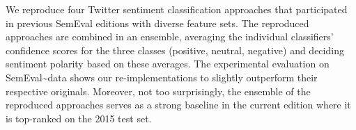 We reproduce four Twitter sentiment classification approaches that participated in previous SemEval editions with diverse feature sets. The reproduced approaches are combined in an ensemble, averaging the individual classifiers' confidence scores for the three classes (positive, neutral, negative) and deciding sentiment polarity based on these averages. The experimental evaluation on SemEval{\textasciitilde}data shows our re-implementations to slightly outperform their respective originals. Moreover, not too surprisingly, the ensemble of the reproduced approaches serves as a strong baseline in the current edition where it is top-ranked on the 2015 test set.
